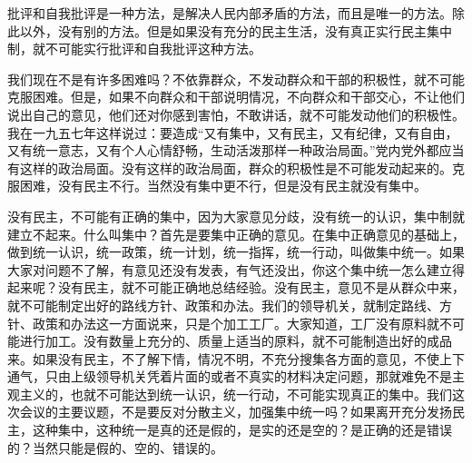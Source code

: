 批评和自我批评是一种方法，是解决人民内部矛盾的方法，而且是唯一的方法。除此以外，没有别的方法。但是如果没有充分的民主生活，没有真正实行民主集中制，就不可能实行批评和自我批评这种方法。

我们现在不是有许多困难吗？不依靠群众，不发动群众和干部的积极性，就不可能克服困难。但是，如果不向群众和干部说明情况，不向群众和干部交心，不让他们说出自己的意见，他们还对你感到害怕，不敢讲话，就不可能发动他们的积极性。我在一九五七年这样说过：要造成“又有集中，又有民主，又有纪律，又有自由，又有统一意志，又有个人心情舒畅，生动活泼那样一种政治局面。”党内党外都应当有这样的政治局面。没有这样的政治局面，群众的积极性是不可能发动起来的。克服困难，没有民主不行。当然没有集中更不行，但是没有民主就没有集中。

没有民主，不可能有正确的集中，因为大家意见分歧，没有统一的认识，集中制就建立不起来。什么叫集中？首先是要集中正确的意见。在集中正确意见的基础上，做到统一认识，统一政策，统一计划，统一指挥，统一行动，叫做集中统一。如果大家对问题不了解，有意见还没有发表，有气还没出，你这个集中统一怎么建立得起来呢？没有民主，就不可能正确地总结经验。没有民主，意见不是从群众中来，就不可能制定出好的路线方针、政策和办法。我们的领导机关，就制定路线、方针、政策和办法这一方面说来，只是个加工工厂。大家知道，工厂没有原料就不可能进行加工。没有数量上充分的、质量上适当的原料，就不可能制造出好的成品来。如果没有民主，不了解下情，情况不明，不充分搜集各方面的意见，不使上下通气，只由上级领导机关凭着片面的或者不真实的材料决定问题，那就难免不是主观主义的，也就不可能达到统一认识，统一行动，不可能实现真正的集中。我们这次会议的主要议题，不是要反对分散主义，加强集中统一吗？如果离开充分发扬民主，这种集中，这种统一是真的还是假的，是实的还是空的？是正确的还是错误的？当然只能是假的、空的、错误的。

